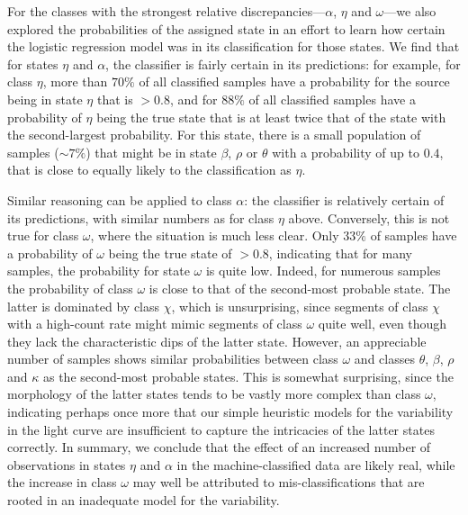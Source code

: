 \documentclass[12pt]{emulateapj}
\begin{document}
For the classes with the strongest relative discrepancies---$\alpha$, $\eta$ and $\omega$---we also explored the probabilities of the assigned state in an 
effort to learn how certain the logistic regression model was in its classification for those states. We find that for states $\eta$ and $\alpha$, the classifier is 
fairly certain in its predictions: for example, for class $\eta$, more than $70\%$ of all classified samples have a probability for the source being in state $\eta$ that is 
$>0.8$, and for $88\%$ of all classified samples have a probability of $\eta$ being the true state that is at least twice that of the state with the second-largest 
probability. For this state, there is a small population of samples ($\sim 7\%$) that might be in state $\beta$, $\rho$ or $\theta$ with a probability of up to $0.4$, that is close to equally likely to the classification as $\eta$. 

Similar reasoning can be applied to class $\alpha$: the classifier is relatively certain of its predictions, with similar numbers as for class $\eta$ above. Conversely, this is not true for class $\omega$, where the situation is much less clear.
Only $33\%$ of samples have a probability of $\omega$ being the true state of $>0.8$, indicating that for many samples, the probability for state $\omega$ is quite low. Indeed, for numerous samples the probability of class $\omega$ is close to that of the second-most probable state. The latter is dominated by class $\chi$, which is unsurprising, since segments of class $\chi$ with a high-count rate might mimic segments of class $\omega$ quite well, even though they lack the characteristic dips of the latter state. However, an appreciable number of samples shows similar probabilities between class $\omega$ and classes $\theta$, $\beta$, $\rho$ and $\kappa$ as the second-most probable states. This is somewhat surprising, since the morphology of the latter states tends to be vastly more complex than class $\omega$, indicating perhaps once more that our simple heuristic models for the variability in the light curve are insufficient to capture the intricacies of the latter states correctly.
In summary, we conclude that the effect of an increased number of observations in states $\eta$ and $\alpha$ in the machine-classified data are likely real, while the increase in class $\omega$ may well be attributed to mis-classifications that are rooted in an inadequate model for the variability.
\end{document}

